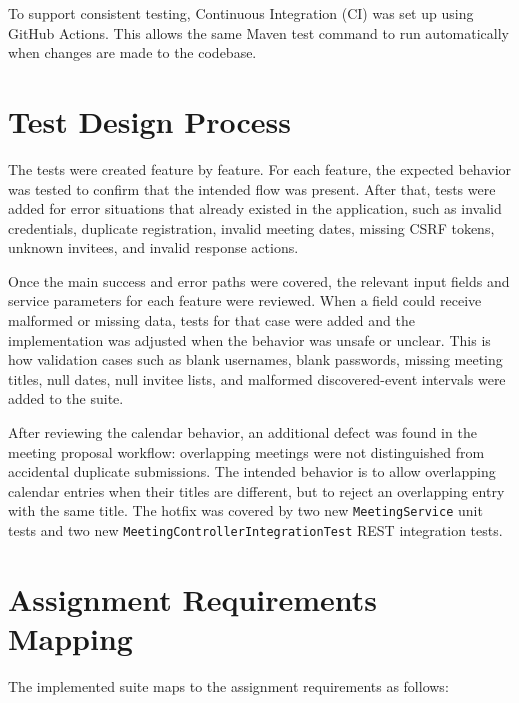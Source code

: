 To support consistent testing, Continuous Integration (CI) was set up using GitHub Actions. This allows the same Maven test command to run automatically when changes are made to the codebase.

\section{Test Design Process}

The tests were created feature by feature. For each feature, the expected behavior was tested to confirm that the intended flow was present. After that, tests were added for error situations that already existed in the application, such as invalid credentials, duplicate registration, invalid meeting dates, missing CSRF tokens, unknown invitees, and invalid response actions.

Once the main success and error paths were covered, the relevant input fields and service parameters for each feature were reviewed. When a field could receive malformed or missing data, tests for that case were added and the implementation was adjusted when the behavior was unsafe or unclear. This is how validation cases such as blank usernames, blank passwords, missing meeting titles, null dates, null invitee lists, and malformed discovered-event intervals were added to the suite.

After reviewing the calendar behavior, an additional defect was found in the meeting proposal workflow: overlapping meetings were not distinguished from accidental duplicate submissions. The intended behavior is to allow overlapping calendar entries when their titles are different, but to reject an overlapping entry with the same title. The hotfix was covered by two new \texttt{MeetingService} unit tests and two new \texttt{MeetingControllerIntegrationTest} REST integration tests.

\section{Assignment Requirements Mapping}

The implemented suite maps to the assignment requirements as follows:

